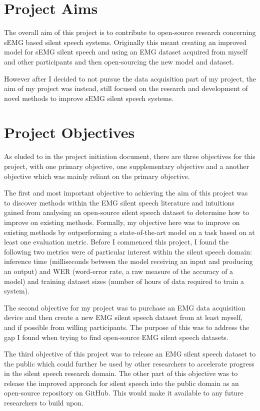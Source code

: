 \section{Project Aims}

The overall aim of this project is to contribute to open-source research concerning
sEMG based silent speech systems. Originally this meant creating an improved model
for sEMG silent speech and using an EMG dataset acquired from myself and other
participants and then open-sourcing the new model and dataset.

However after I decided to not pursue the data acquisition part of my project,
the aim of my project was instead, still focused on the research and development
of novel methods to improve sEMG silent speech systems.

\section{Project Objectives}

As eluded to in the project initiation document, there are three objectives
for this project, with one primary objective, one supplementary objective
and a another objective which was mainly reliant on the primary objective.

The first and most important objective to achieving the aim of this project
was to discover methods within the EMG silent speech literature and intuitions
gained from analysing an open-source silent speech dataset to determine how
to improve on existing methods.
Formally, my objective here was to improve
on existing methods by outperforming a state-of-the-art model on a task
based on at least one evaluation metric. Before I commenced this project,
I found the following two metrics were of particular interest within the
silent speech domain: inference time (milliseconds between the model
receiving an input and producing an output) and WER (word-error rate,
a raw measure of the accuracy of a model) and training dataset sizes
(number of hours of data required to train a system).

The second objective for my project was to purchase an EMG data acquisition
device and then create a new EMG silent speech dataset from at least
myself, and if possible from willing participants. The purpose of this
was to address the gap I found when trying to find open-source EMG silent
speech datasets.

The third objective of this project was to release an EMG silent speech
dataset to the public which could further be used by other researchers
to accelerate progress in the silent speech research domain. The other
part of this objective was to release the improved approach for silent
speech into the public domain as an open-source repository on GitHub.
This would make it available to any future researchers to build upon.
